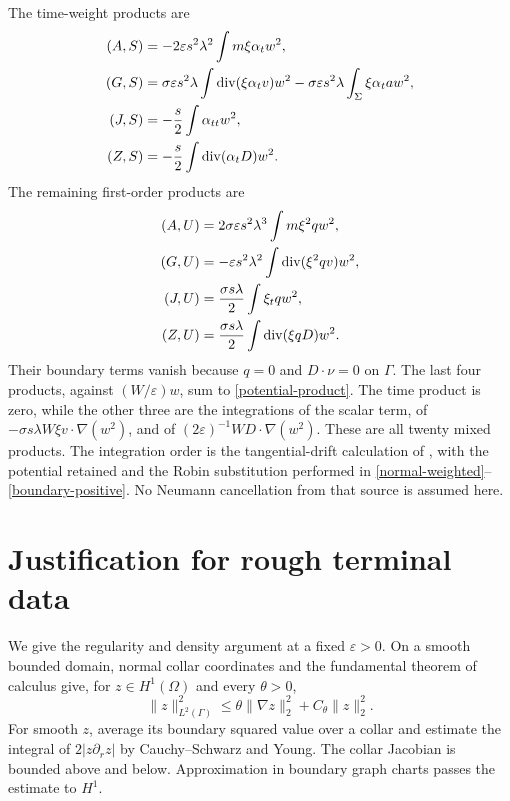 \documentclass[11pt]{article}
\theoremstyle{remark}
\newcommand{\eps}{\varepsilon}
\newcommand{\divg}{\operatorname{div}}
\begin{document}
The time-weight products are
\begin{align}
 (A,S)&=-2\eps s^2\lambda^2\int m\xi\alpha_tw^2,\notag\\
 (G,S)&=\sigma\eps s^2\lambda\int\divg(\xi\alpha_tv)w^2
       -\sigma\eps s^2\lambda\int_\Sigma\xi\alpha_ta w^2,\notag\\
 (J,S)&=-\frac s2\int\alpha_{tt}w^2,\notag\\
 (Z,S)&=-\frac s2\int\divg(\alpha_tD)w^2.
 \label{products-S}
\end{align}
The remaining first-order products are
\begin{align}
 (A,U)&=2\sigma\eps s^2\lambda^3\int m\xi^2q w^2,\notag\\
 (G,U)&=-\eps s^2\lambda^2\int\divg(\xi^2qv)w^2,\notag\\
 (J,U)&=\frac{\sigma s\lambda}{2}\int\xi_tq w^2,\notag\\
 (Z,U)&=\frac{\sigma s\lambda}{2}\int\divg(\xi qD)w^2.
 \label{products-U}
\end{align}
Their boundary terms vanish because $q=0$ and $D\cdot\nu=0$ on $\Gamma$.
The last four products, against $(W/\eps)w$, sum to
\eqref{potential-product}. The time product is zero, while the other three
are the integrations of the scalar term, of
$-\sigma s\lambda W\xi v\cdot\nabla(w^2)$, and of
$(2\eps)^{-1}WD\cdot\nabla(w^2)$. These are all twenty mixed products.
The integration order is the tangential-drift calculation of
\cite[Section 6]{Tangential}, with the potential retained and the Robin
substitution performed in \eqref{normal-weighted}--\eqref{boundary-positive}.
No Neumann cancellation from that source is assumed here.

\section{Justification for rough terminal data}\label{app:regularity}

We give the regularity and density argument at a fixed $\eps>0$. On a smooth
bounded domain, normal collar coordinates and the fundamental theorem of
calculus give, for $z\in H^1(\Omega)$ and every $\theta>0$,
\begin{equation}\label{trace}
 \|z\|_{L^2(\Gamma)}^2\le\theta\|\nabla z\|_2^2+C_\theta\|z\|_2^2.
\end{equation}
For smooth $z$, average its boundary squared value over a collar and estimate
the integral of $2|z\partial_rz|$ by Cauchy--Schwarz and Young. The collar
Jacobian is bounded above and below. Approximation in boundary graph charts
passes the estimate to $H^1$.
\end{document}

